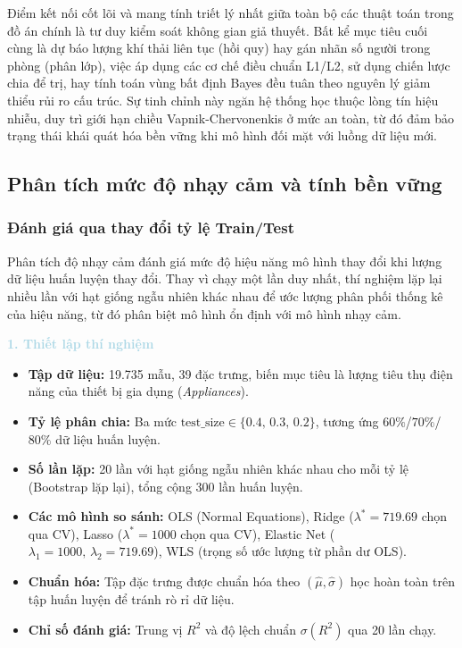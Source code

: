 Điểm kết nối cốt lõi và mang tính triết lý nhất giữa toàn bộ các thuật toán trong đồ án chính là tư duy kiểm soát không gian giả thuyết. Bất kể mục tiêu cuối cùng là dự báo lượng khí thải liên tục (hồi quy) hay gán nhãn số người trong phòng (phân lớp), việc áp dụng các cơ chế điều chuẩn L1/L2, sử dụng chiến lược chia để trị, hay tính toán vùng bất định Bayes đều tuân theo nguyên lý giảm thiểu rủi ro cấu trúc. Sự tinh chỉnh này ngăn hệ thống học thuộc lòng tín hiệu nhiễu, duy trì giới hạn chiều Vapnik-Chervonenkis ở mức an toàn, từ đó đảm bảo trạng thái khái quát hóa bền vững khi mô hình đối mặt với luồng dữ liệu mới.

\subsection{Phân tích mức độ nhạy cảm và tính bền vững}
\subsubsection{Đánh giá qua thay đổi tỷ lệ Train/Test}

Phân tích độ nhạy cảm đánh giá mức độ hiệu năng mô hình thay đổi khi lượng dữ liệu huấn luyện thay đổi.
Thay vì chạy một lần duy nhất, thí nghiệm lặp lại nhiều lần với hạt giống ngẫu nhiên khác nhau
để ước lượng phân phối thống kê của hiệu năng, từ đó phân biệt mô hình ổn định với mô hình nhạy cảm.

\vspace{0.5em}
\noindent\textcolor{lightblue}{\textbf{1. Thiết lập thí nghiệm}}
\vspace{0.5em}

\begin{itemize}
    \item \textbf{Tập dữ liệu:} 19.735 mẫu, 39 đặc trưng, biến mục tiêu là lượng tiêu thụ điện năng của thiết bị gia dụng (\textit{Appliances}).
    \item \textbf{Tỷ lệ phân chia:} Ba mức $\text{test\_size} \in \{0.4,\, 0.3,\, 0.2\}$, tương ứng $60\%$/$70\%$/$80\%$ dữ liệu huấn luyện.
    \item \textbf{Số lần lặp:} 20 lần với hạt giống ngẫu nhiên khác nhau cho mỗi tỷ lệ (Bootstrap lặp lại), tổng cộng 300 lần huấn luyện.
    \item \textbf{Các mô hình so sánh:} OLS (Normal Equations), Ridge ($\lambda^* = 719.69$ chọn qua CV), Lasso ($\lambda^* = 1000$ chọn qua CV), Elastic Net ($\lambda_1 = 1000,\, \lambda_2 = 719.69$), WLS (trọng số ước lượng từ phần dư OLS).
    \item \textbf{Chuẩn hóa:} Tập đặc trưng được chuẩn hóa theo $(\hat{\mu}, \hat{\sigma})$ học hoàn toàn trên tập huấn luyện để tránh rò rỉ dữ liệu.
    \item \textbf{Chỉ số đánh giá:} Trung vị $R^2$ và độ lệch chuẩn $\sigma(R^2)$ qua 20 lần chạy.
\end{itemize}

